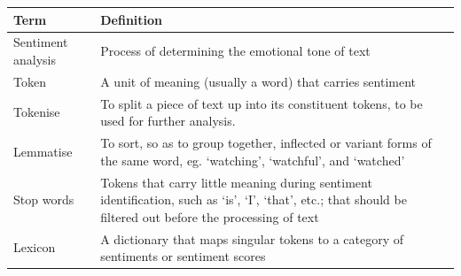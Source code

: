\documentclass[12pt,bibliography=totocnumbered]{scrartcl}
\begin{document}
\begin{center}
	\begin{longtable}{|p{}|p{}|}
		\hline
		\bf{Term}                        & \bf{Definition}                                                                                                                                                                                                                                     \\
		\hline
		Sentiment analysis               & Process of determining the emotional tone of text                                                                                                                                                                                                   \\
		\hline
		Token                            & A unit of meaning (usually a word) that carries sentiment                                                                                                                                                                                           \\
		\hline
		Tokenise                         & To split a piece of text up into its constituent tokens, to be used for further analysis.                                                                                                                                                           \\
		\hline
		Lemmatise                        & To sort, so as to group together, inflected or variant forms of the same word, eg. `watching', `watchful', and `watched'                                                                                                                            \\
		\hline
		Stop words                       & Tokens that carry little meaning during sentiment identification, such as `is', `I', `that', etc.; that should be filtered out before the processing of text                                                                                        \\
		\hline
		Lexicon                          & A dictionary that maps singular tokens to a category of sentiments or sentiment scores                                                                                                                                                              \\

\end{longtable}
\end{center}
\end{document}
